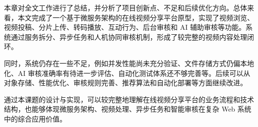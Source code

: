 本章对全文工作进行了总结，并分析了项目创新点、不足和后续优化方向。总体来看，本文完成了一个基于微服务架构的在线视频分享平台原型，实现了视频浏览、视频投稿、分片上传、转码播放、互动行为、后台审核和 AI 辅助审核等功能。系统通过服务拆分、异步任务和人机协同审核机制，形成了较完整的视频内容处理闭环。

同时，系统仍存在一些不足，例如并发性能尚未充分验证、文件存储方式仍偏本地化、AI 审核准确率有待进一步评估、自动化测试体系还不够完善等。后续可以从对象存储、性能优化、审核规则完善、推荐算法和自动化部署等方面继续改进。

通过本课题的设计与实现，可以较完整地理解在线视频分享平台的业务流程和技术结构，也能够体现微服务架构、视频处理、异步任务和智能审核在复杂 Web 系统中的综合应用价值。
